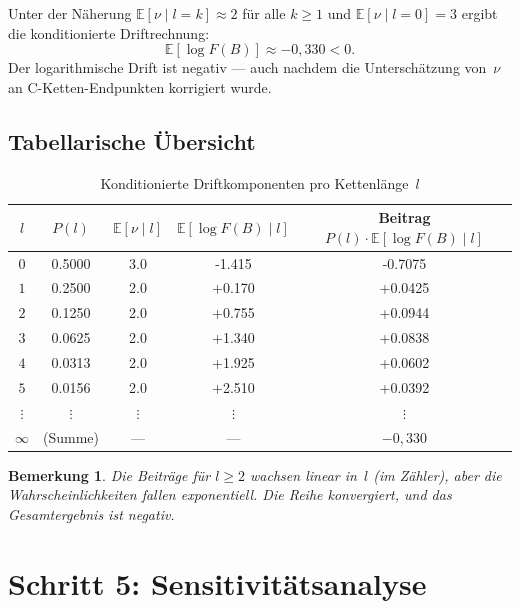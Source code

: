 \documentclass[12pt,a4paper]{article}
\newtheorem{bemerkung}[definition]{Bemerkung}
\newcommand{\E}{\mathbb{E}}
\newcommand{\logF}{\log F(B)}
\begin{document}
\begin{tcolorbox}[ergebnis, title={Hauptergebnis der konditionierten Rechnung (heuristisch)}]
Unter der Näherung $\E[\nu \mid l{=}k] \approx 2$ für alle $k \geq 1$
und $\E[\nu \mid l{=}0] = 3$ ergibt die konditionierte Driftrechnung:
\[
  \boxed{\E[\logF] \approx -0{,}330 < 0.}
\]
Der logarithmische Drift ist negativ — auch nachdem die Unterschätzung
von~$\nu$ an C-Ketten-Endpunkten korrigiert wurde.
\end{tcolorbox}

\subsection{Tabellarische Übersicht}

\begin{table}[h!]
\centering
\caption{Konditionierte Driftkomponenten pro Kettenlänge~$l$}
\label{tab:driftkomponenten}
\renewcommand{\arraystretch}{1.35}
\begin{tabular}{
  c
  S[table-format=1.4]
  S[table-format=1.1]
  S[table-format=+1.3]
  S[table-format=+1.4]
}
\toprule
$l$ & {$P(l)$} & {$\E[\nu \mid l]$} & {$\E[\logF \mid l]$} & {Beitrag $P(l)\cdot\E[\logF \mid l]$} \\
\midrule
$0$      & 0.5000  & 3.0 & -1.415 & -0.7075 \\
$1$      & 0.2500  & 2.0 & +0.170 & +0.0425 \\
$2$      & 0.1250  & 2.0 & +0.755 & +0.0944 \\
$3$      & 0.0625  & 2.0 & +1.340 & +0.0838 \\
$4$      & 0.0313  & 2.0 & +1.925 & +0.0602 \\
$5$      & 0.0156  & 2.0 & +2.510 & +0.0392 \\
{$\vdots$} & {$\vdots$} & {$\vdots$} & {$\vdots$} & {$\vdots$} \\
{$\infty$} & {(Summe)} & {---} & {---} & {$-0{,}330$} \\
\bottomrule
\end{tabular}
\end{table}

\begin{bemerkung}
Die Beiträge für $l \geq 2$ wachsen linear in~$l$ (im Zähler), aber die
Wahrscheinlichkeiten fallen exponentiell.
Die Reihe konvergiert, und das Gesamtergebnis ist negativ.
\end{bemerkung}

\section{Schritt 5: Sensitivitätsanalyse}
\label{sec:sensitivitaet}
\end{document}
